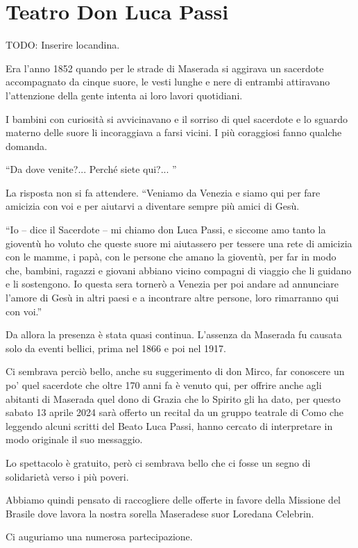\section{Teatro Don Luca Passi}

TODO: Inserire locandina.


Era l’anno 1852 quando per le strade di Maserada si aggirava un sacerdote accompagnato da cinque suore, le vesti lunghe e nere di entrambi attiravano l’attenzione della gente intenta ai loro lavori quotidiani.

I bambini con curiosità si avvicinavano e il sorriso di quel sacerdote e lo sguardo materno delle suore li incoraggiava a farsi vicini. I più coraggiosi fanno qualche domanda.

``Da dove venite?... Perché siete qui?... ''

La risposta non si fa attendere. ``Veniamo da Venezia e siamo qui per fare amicizia con voi e per aiutarvi a diventare sempre più amici di Gesù.

``Io -- dice il Sacerdote -- mi chiamo don Luca Passi, e siccome amo tanto la gioventù ho voluto che queste suore mi aiutassero per tessere una rete di amicizia con le mamme, i papà, con le persone che amano la gioventù, per far in modo che, bambini, ragazzi e giovani abbiano vicino compagni di viaggio che li guidano e li sostengono.  Io questa sera tornerò a Venezia per poi andare ad annunciare l’amore di Gesù in altri paesi e a incontrare altre persone, loro rimarranno  qui con voi.''

Da allora la presenza è stata quasi continua. L’assenza da Maserada fu causata solo da eventi bellici, prima nel 1866 e poi nel 1917.

Ci sembrava perciò bello, anche su suggerimento di don Mirco, far conoscere un po’ quel sacerdote che  oltre 170 anni fa è venuto qui, per offrire anche agli abitanti di Maserada quel dono di Grazia che lo Spirito gli ha dato, per questo sabato 13 aprile 2024 sarà offerto un recital da un gruppo teatrale di Como che leggendo alcuni scritti del Beato Luca Passi, hanno cercato di interpretare in modo originale il suo messaggio.

Lo spettacolo è gratuito, però ci sembrava bello che ci fosse un segno di solidarietà verso i più poveri.

Abbiamo quindi pensato di raccogliere delle offerte in favore della Missione  del Brasile dove lavora la nostra sorella Maseradese suor Loredana Celebrin.

Ci auguriamo una numerosa partecipazione.

